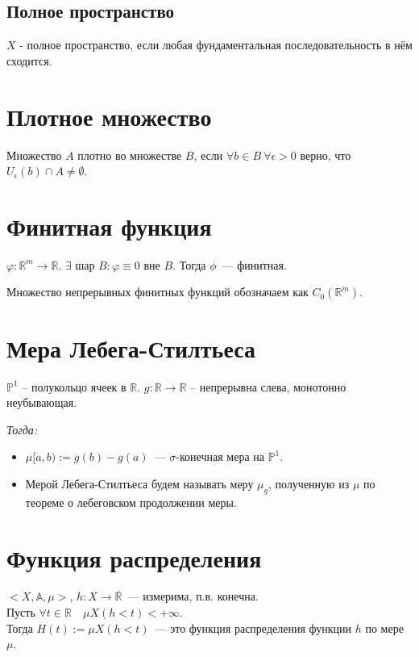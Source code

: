 \documentclass[paper=a4, fontsize=17pt]{article}
\begin{document}
	\subsection{Полное пространство}
	$X$ - полное пространство, если любая фундаментальная последовательность в нём сходится.

	\section{Плотное множество}
	Множество $A$ плотно во множестве $B$, если $\forall b \in B \ \forall \epsilon > 0$ верно, что $U_\epsilon(b) \cap A \neq \emptyset$.

	\section{Финитная функция}
	$\varphi : \mathbb{R}^m \rightarrow \mathbb{R}$. $\exists$ шар $B: \varphi \equiv 0 $ вне $B$. Тогда $\phi$~--- финитная.
    
    Множество непрерывных финитных функций обозначаем как $C_0(\mathbb{R}^m)$.

	\section{Мера Лебега-Стилтьеса}
	$\mathbb{P}^1$ -- полукольцо ячеек в $\mathds{R}$.
	$g : \mathbb{R} \rightarrow \mathbb{R}$ -- непрерывна слева, монотонно неубывающая.
	
	\emph{Тогда:} 
	
	\begin{itemize}
	
    \item	$\mu [a, b):=g(b) - g(a)$~--- $\sigma$-конечная мера на $\mathbb{P}^1$.

	 \item Мерой Лебега-Стилтьеса будем называть меру $\mu_g$, полученную из $\mu$ по теореме о лебеговском продолжении меры.

	\end{itemize}

	\section{Функция распределения}
	$<X, \mathds{A}, \mu> $, $h: X \rightarrow \overline{\mathbb{R}}$~--- измерима, п.в. конечна.\\

	Пусть $\forall t \in \mathbb{R}\quad \mu X(h < t) < +\infty$.\\
	Тогда $H(t):=\mu X(h < t)$~--- это функция распределения функции $h$ по мере $\mu$.
\end{document}
